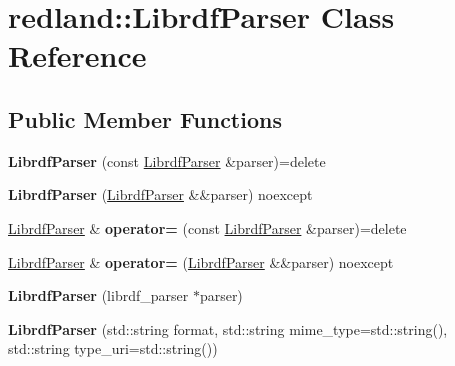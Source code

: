 \hypertarget{classredland_1_1LibrdfParser}{}\section{redland\+:\+:Librdf\+Parser Class Reference}
\label{classredland_1_1LibrdfParser}
\subsection*{Public Member Functions}
\begin{DoxyCompactItemize}
\item 
\mbox{\label{classredland_1_1LibrdfParser_a884b4e7cb05942390fba7765cfb3aec8}} 
{\bfseries Librdf\+Parser} (const \hyperlink{classredland_1_1LibrdfParser}{Librdf\+Parser} \&parser)=delete
\item 
\mbox{\label{classredland_1_1LibrdfParser_a8c75ee321bd82076491aa0d63d0664c8}} 
{\bfseries Librdf\+Parser} (\hyperlink{classredland_1_1LibrdfParser}{Librdf\+Parser} \&\&parser) noexcept
\item 
\mbox{\label{classredland_1_1LibrdfParser_aeee1312383f2e3f72e49076390a2a27b}} 
\hyperlink{classredland_1_1LibrdfParser}{Librdf\+Parser} \& {\bfseries operator=} (const \hyperlink{classredland_1_1LibrdfParser}{Librdf\+Parser} \&parser)=delete
\item 
\mbox{\label{classredland_1_1LibrdfParser_a5a5e09075b43906c9161d453ac63ab8a}} 
\hyperlink{classredland_1_1LibrdfParser}{Librdf\+Parser} \& {\bfseries operator=} (\hyperlink{classredland_1_1LibrdfParser}{Librdf\+Parser} \&\&parser) noexcept
\item 
\mbox{\label{classredland_1_1LibrdfParser_ac1373b22444c108a2a67dbf24fa4ca92}} 
{\bfseries Librdf\+Parser} (librdf\+\_\+parser $\ast$parser)
\item 
\mbox{\label{classredland_1_1LibrdfParser_afa206d1b923c66ecc206afe83834382e}} 
{\bfseries Librdf\+Parser} (std\+::string format, std\+::string mime\+\_\+type=std\+::string(), std\+::string type\+\_\+uri=std\+::string())
\item 

\end{DoxyCompactItemize}
